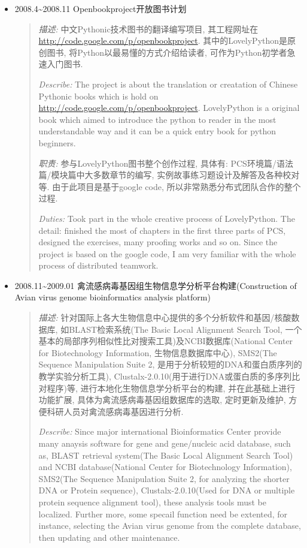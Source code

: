 \documentclass[a4paper,10pt,english]{manual}
\begin{document}
\begin{itemize}
\item {} 
2008.4\textasciitilde{}2008.11 Openbookproject开放图书计划
\begin{quote}

\emph{描述:} 中文Pythonic技术图书的翻译编写项目, 其工程网址在 \href{http://code.google.com/p/openbookproject/}{http://code.google.com/p/openbookproject}. 其中的LovelyPython是原创图书, 将Python以最易懂的方式介绍给读者, 可作为Python初学者急速入门图书.

\emph{Describe:} The project is about the translation or creatation of Chinese Pythonic books which is hold on \href{http://code.google.com/p/openbookproject/}{http://code.google.com/p/openbookproject}. LovelyPython is a original book which aimed to introduce the python to reader in the most understandable way and it can be a quick entry book for python beginners.

\emph{职责:} 参与LovelyPython图书整个创作过程, 具体有: PCS环境篇/语法篇/模块篇中大多数章节的编写, 实例故事练习题设计及解答及各种校对等. 由于此项目是基于google code, 所以非常熟悉分布式团队合作的整个过程.

\emph{Duties:} Took part in the whole creative process of LovelyPython. The detail: finished the most of chapters in the first three parts of PCS,  designed the exercises, many proofing works and so on. Since the project is based on the google code, I am very familiar with the whole process of distributed teamwork.
\end{quote}

\item {} 
2008.11\textasciitilde{}2009.01 禽流感病毒基因组生物信息学分析平台构建(Construction of Avian virus genome bioinformatics analysis platform)
\begin{quote}

\emph{描述:} 针对国际上各大生物信息中心提供的多个分析软件和基因/核酸数据库, 如BLAST检索系统(The Basic Local Alignment Search Tool, 一个基本的局部序列相似性比对搜索工具)及NCBI数据库(National Center for Biotechnology Information, 生物信息数据库中心), SMS2(The Sequence Manipulation Suite 2, 是用于分析较短的DNA和蛋白质序列的教学实验分析工具), Clustalx-2.0.10(用于进行DNA或蛋白质的多序列比对程序)等, 进行本地化生物信息学分析平台的构建, 并在此基础上进行功能扩展, 具体为禽流感病毒基因组数据库的选取, 定时更新及维护, 方便科研人员对禽流感病毒基因进行分析.

\emph{Describe:} Since major international Bioinformatics Center provide many anaysis software for gene and gene/nucleic acid database, such as, BLAST retrieval system(The Basic Local Alignment Search Tool) and NCBI database(National Center for Biotechnology Information), SMS2(The Sequence Manipulation Suite 2, for analyzing the shorter DNA or Protein sequence), Clustalx-2.0.10(Used for DNA or multiple protein sequence alignment tool), these analysis tools must be localized. Further more, some specail function need be extented, for instance, selecting the Avian virus genome from the complete database, then updating and other maintenance.


\end{quote}
\end{itemize}
\end{document}
